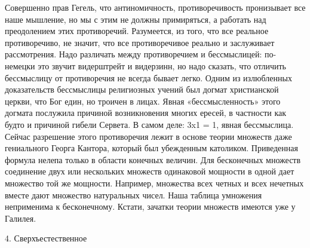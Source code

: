 Совершенно прав Гегель, что антиномичность, противоречивость пронизывает все
наше мышление, но мы с этим не должны примиряться, а работать над преодолением
этих противоречий. Разумеется, из того, что все реальное противоречиво, не
значит, что все противоречивое реально и заслуживает рассмотрения. Надо
различать между противоречием и бессмыслицей: по-немецки это звучит видерштрейт
и видерзинн, но надо сказать, что отличить бессмыслицу от противоречия не
всегда бывает легко. Одним из излюбленных доказательств бессмыслицы религиозных
учений был догмат христианской церкви, что Бог един, но троичен в лицах. Явная
«бессмысленность» этого догмата послужила причиной возникновения многих ересей,
в частности как будто и причиной гибели Сервета. В самом деле: 3x1 = 1, явная
бессмыслица. Сейчас разрешение этого противоречия лежит в основе теории
множеств даже гениального Георга Кантора, который был убежденным католиком.
Приведенная формула нелепа только в области конечных величин. Для бесконечных
множеств соединение двух или нескольких множеств одинаковой мощности в одной
дает множество той же мощности. Например, множества всех четных и всех нечетных
вместе дают множество натуральных чисел. Наша таблица умножения неприменима к
бесконечному. Кстати, зачатки теории множеств имеются уже у Галилея.

4. Сверхъестественное

